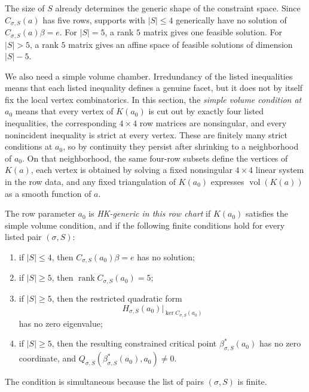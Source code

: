 \begin{unverified}
The size of \(S\) already determines the generic shape of the constraint
space. Since \(C_{\sigma,S}(a)\) has five rows, supports with
\(|S|\leq 4\) generically have no solution of
\(C_{\sigma,S}(a)\beta=e\). For \(|S|=5\), a rank \(5\) matrix gives one
feasible solution. For \(|S|>5\), a rank \(5\) matrix gives an affine space of
feasible solutions of dimension \(|S|-5\).

We also need a simple volume chamber. Irredundancy of the listed inequalities
means that each listed inequality defines a genuine facet, but it does not by
itself fix the local vertex combinatorics. In this section, the \emph{simple
volume condition at \(a_0\)} means that every vertex of \(K(a_0)\) is cut out
by exactly four listed inequalities, the corresponding \(4\times4\) row
matrices are nonsingular, and every nonincident inequality is strict at every
vertex. These are finitely many strict conditions at \(a_0\), so by continuity
they persist after shrinking to a neighborhood of \(a_0\). On that
neighborhood, the same four-row subsets define the vertices of \(K(a)\), each
vertex is obtained by solving a fixed nonsingular \(4\times4\) linear system
in the row data, and any fixed triangulation of \(K(a_0)\) expresses
\(\operatorname{vol}(K(a))\) as a smooth function of \(a\).

\begin{definition}
\label{def:hk-generic-row-parameter}
The row parameter \(a_0\) is \emph{HK-generic in this row chart} if
\(K(a_0)\) satisfies the simple volume condition, and if the following finite
conditions hold for every listed pair \((\sigma,S)\):
\begin{enumerate}
\item if \(|S|\leq4\), then \(C_{\sigma,S}(a_0)\beta=e\) has no solution;
\item if \(|S|\geq5\), then \(\operatorname{rank} C_{\sigma,S}(a_0)=5\);
\item if \(|S|\geq5\), then the restricted quadratic form
  \[
    H_{\sigma,S}(a_0)|_{\ker C_{\sigma,S}(a_0)}
  \]
  has no zero eigenvalue;
\item if \(|S|\geq5\), then the resulting constrained critical point
  \(\beta^*_{\sigma,S}(a_0)\) has no zero coordinate, and
  \(Q_{\sigma,S}(\beta^*_{\sigma,S}(a_0),a_0)\neq0\).
\end{enumerate}
The condition is simultaneous because the list of pairs \((\sigma,S)\) is
finite.
\end{definition}


\end{unverified}
